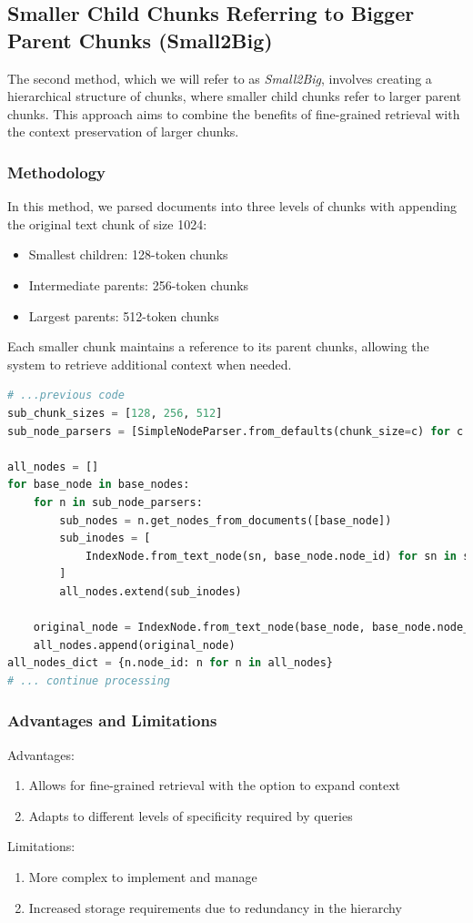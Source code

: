 \subsection{Smaller Child Chunks Referring to Bigger Parent Chunks (Small2Big)}\label{subsec:smaller-child-chunks-referring-to-bigger-parent-chunks}
The second method, which we will refer to as \textit{Small2Big}, involves creating a hierarchical structure of chunks, where smaller child chunks refer to larger parent chunks.
This approach aims to combine the benefits of fine-grained retrieval with the context preservation of larger chunks.
\subsubsection{Methodology}
In this method, we parsed documents into three levels of chunks with appending the original text chunk of size 1024:
\begin{itemize}
    \item Smallest children: 128-token chunks
    \item Intermediate parents: 256-token chunks
    \item Largest parents: 512-token chunks
\end{itemize}
Each smaller chunk maintains a reference to its parent chunks, allowing the system to retrieve additional context when needed.


\begin{lstlisting}[language=Python, caption=Small2Big Chunking Method, label=lst:small2big_chunking]
# ...previous code
sub_chunk_sizes = [128, 256, 512]
sub_node_parsers = [SimpleNodeParser.from_defaults(chunk_size=c) for c in sub_chunk_sizes]

all_nodes = []
for base_node in base_nodes:
    for n in sub_node_parsers:
        sub_nodes = n.get_nodes_from_documents([base_node])
        sub_inodes = [
            IndexNode.from_text_node(sn, base_node.node_id) for sn in sub_nodes
        ]
        all_nodes.extend(sub_inodes)

    original_node = IndexNode.from_text_node(base_node, base_node.node_id) # also add original node to node
    all_nodes.append(original_node)
all_nodes_dict = {n.node_id: n for n in all_nodes}
# ... continue processing
\end{lstlisting}

\subsubsection{Advantages and Limitations}
Advantages:
\begin{enumerate}
    \item Allows for fine-grained retrieval with the option to expand context
    \item Adapts to different levels of specificity required by queries
\end{enumerate}
Limitations:
\begin{enumerate}
    \item More complex to implement and manage
    \item Increased storage requirements due to redundancy in the hierarchy
\end{enumerate}
